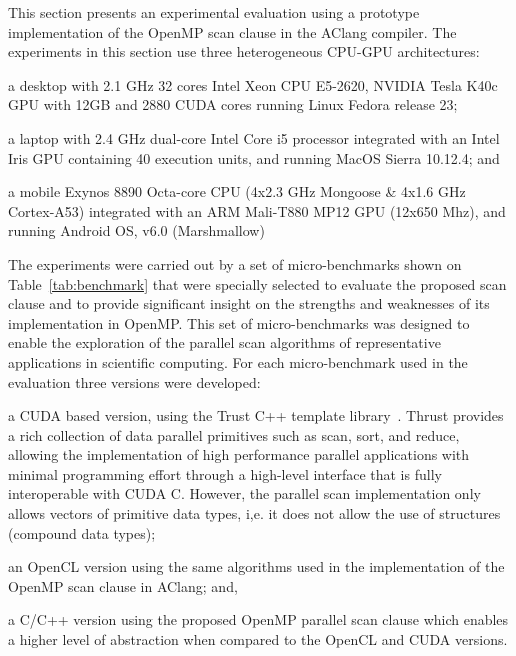 \documentclass[Ingles]{ic-tese-v1}
\begin{document}
This  section presents  an experimental  evaluation using  a prototype
implementation of  the OpenMP scan  clause in the AClang compiler.
The  experiments in this section  use  three   heterogeneous  CPU-GPU
architectures:
\begin{inparaenum}[(i)\upshape]
	\item a desktop with 2.1 GHz 32 cores Intel Xeon CPU E5-2620,
	NVIDIA Tesla K40c GPU with 12GB and 2880 CUDA cores  running
	Linux Fedora  release 23;
	\item  a  laptop  with  2.4  GHz dual-core  Intel  Core  i5  processor
	integrated with an Intel Iris GPU containing 40 execution units, and
	running MacOS Sierra 10.12.4; and
	\item a mobile  Exynos 8890 Octa-core  CPU (4x2.3 GHz Mongoose  \& 4x1.6
	GHz Cortex-A53)  integrated with an  ARM Mali-T880 MP12  GPU (12x650
	Mhz), and running Android OS, v6.0 (Marshmallow)
\end{inparaenum}

The experiments were carried out by a set of micro-benchmarks
shown on  Table~\ref{tab:benchmark} that were specially selected to  evaluate
the  proposed scan clause  and to  provide significant
insight on the strengths and weaknesses of its  implementation in OpenMP.
This set of  micro-benchmarks was designed to  enable the exploration
of  the  parallel scan  algorithms  of  representative applications  in
scientific computing.  For each micro-benchmark  used  in   the  evaluation
three  versions  were developed:
\begin{inparaenum}[(i)\upshape]
	\item a CUDA based version, using the Trust C++ template library~\cite{trust}.
	Thrust provides a  rich collection of data  parallel primitives such
	as scan,  sort, and reduce,  allowing the implementation of  high performance
	parallel  applications with  minimal  programming  effort through  a
	high-level  interface   that  is   fully  interoperable   with  CUDA
	C. However, the parallel scan  implementation only allows vectors of
	primitive  data  types, i,e.   it  does  not  allow the  use  of
	structures (compound data types);
	\item an  OpenCL version using the same algorithms used in the
	implementation of the OpenMP scan clause in AClang; and,
	\item a C/C++ version using the proposed OpenMP parallel scan clause
	which enables a  higher level of abstraction when compared to the OpenCL and
	CUDA versions.
\end{inparaenum}
\end{document}
